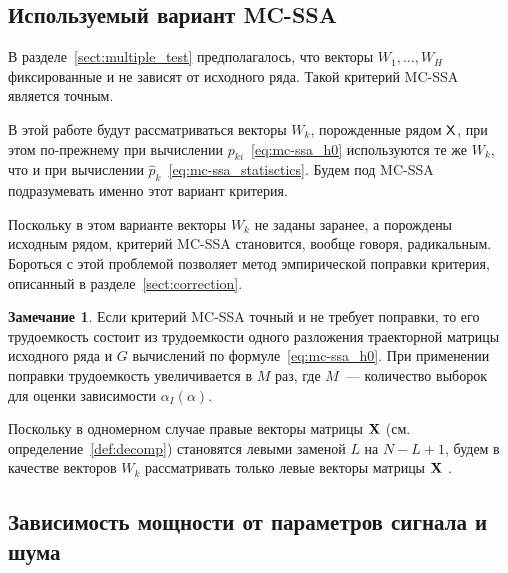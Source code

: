 \documentclass[specialist,
substylefile = spbu_report.rtx,
subf,href,colorlinks=true, 12pt]{disser}
\theoremstyle{definition}
\newtheorem{remark}{Замечание}
\begin{document}
\subsection{Используемый вариант MC-SSA}\label{sect:vectors_choise}

В разделе~\ref{sect:multiple_test} предполагалось, что векторы $W_1,\ldots, W_H$ фиксированные и не зависят от исходного ряда. Такой критерий MC-SSA является точным.

В этой работе будут рассматриваться векторы $W_k$, порожденные рядом $\mathsf{X}$, при этом по-прежнему при вычислении $p_{ki}$~\eqref{eq:mc-ssa_h0} используются те же $W_k$, что и при вычислении $\widehat p_k$~\eqref{eq:mc-ssa_statisctics}. Будем под MC-SSA подразумевать именно этот вариант критерия.

Поскольку в этом варианте векторы $W_k$ не заданы заранее, а порождены исходным рядом, критерий MC-SSA становится, вообще говоря, радикальным. Бороться с этой проблемой позволяет метод эмпирической поправки критерия, описанный в разделе~\ref{sect:correction}.

\begin{remark}\label{remark:complexity}
	Если критерий MC-SSA точный и не требует поправки, то его трудоемкость состоит из трудоемкости одного разложения траекторной матрицы исходного ряда и $G$ вычислений по формуле~\eqref{eq:mc-ssa_h0}. При применении поправки трудоемкость увеличивается в $M$ раз, где $M$~--- количество выборок для оценки зависимости $\alpha_I(\alpha)$.
\end{remark}

Поскольку в одномерном случае правые векторы матрицы $\mathbf{X}$ (см. определение~\ref{def:decomp}) становятся левыми заменой $L$ на $N-L+1$, будем в качестве векторов $W_k$ рассматривать только левые векторы матрицы $\mathbf{X}$ .


\subsection{Зависимость мощности от параметров сигнала и шума}
\end{document}
